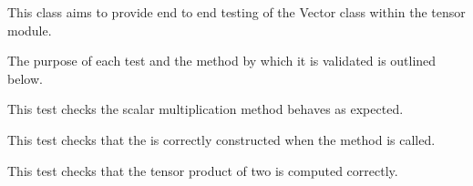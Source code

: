 \documentclass[letterpaper,10pt,english]{sphinxmanual}
\begin{document}

\begin{fulllineitems}
\label{\detokenize{index:tests.test_tensor.TestVector}}
\pysigstartsignatures
{}
\pysigstopsignatures
\sphinxAtStartPar
This class aims to provide end to end testing of the
Vector class within the tensor module.

\sphinxAtStartPar
The purpose of each test and the method by which it
is validated is outlined below.

\begin{fulllineitems}
\label{\detokenize{index:tests.test_tensor.TestVector.test_scalar_multiplication}}
\pysigstartsignatures
{}
\pysigstopsignatures
\sphinxAtStartPar
This test checks the scalar multiplication method behaves
as expected.

\end{fulllineitems}


\begin{fulllineitems}
\label{\detokenize{index:tests.test_tensor.TestVector.test_vector_construction}}
\pysigstartsignatures
{}
\pysigstopsignatures
\sphinxAtStartPar
This test checks that the  is correctly constructed
when the  method is called.

\end{fulllineitems}


\begin{fulllineitems}
\label{\detokenize{index:tests.test_tensor.TestVector.test_vector_tensor_product}}
\pysigstartsignatures
{}
\pysigstopsignatures
\sphinxAtStartPar
This test checks that the tensor product of two  is computed
correctly.

\end{fulllineitems}


\end{fulllineitems}
\end{document}
